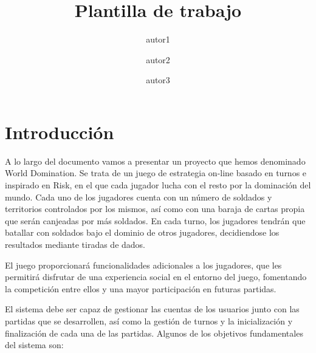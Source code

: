 \documentclass[11pt, a4paper, titlepage]{article}
\title{Plantilla de trabajo}
\author{autor1 \and autor2 \and autor3}
\date{\monthyear}
\begin{document}
 


\begin{titlepage}

\thispagestyle{empty}


\end{titlepage}
\newpage





\thispagestyle{empty}
\fontsize{11pt}{11pt}\selectfont

\setcounter{tocdepth}{2}

{
    \hypersetup{linkcolor=black}
    \doublespacing
    \tableofcontents
}

\thispagestyle{empty}

\clearpage
\setcounter{page}{1}
\section{Introducción}
A lo largo del documento vamos a presentar un proyecto que hemos denominado World Domination. Se trata de un juego de estrategia on-line basado en turnos e inspirado en Risk, en el que cada jugador lucha con el resto por la dominación del mundo. Cada uno de los jugadores cuenta con un número de soldados y territorios controlados por los mismos, así como con una baraja de cartas propia que serán canjeadas por más soldados. En cada turno, los jugadores tendrán que batallar con soldados bajo el dominio de otros jugadores, decidiendose los resultados mediante tiradas de dados. \newline

El juego proporcionará funcionalidades adicionales a los jugadores, que les permitirá disfrutar de una experiencia social en el entorno del juego, fomentando la competición entre ellos y una mayor participación en futuras partidas. \newline

El sistema debe ser capaz de gestionar las cuentas de los usuarios junto con las partidas que se desarrollen, así como la gestión de turnos y la inicialización y finalización de cada una de las partidas. Algunos de los objetivos fundamentales del sistema son: 
\end{document}
